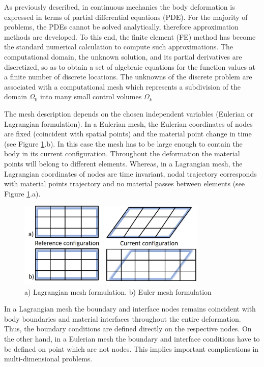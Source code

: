 
\label{section:lagrangianmesh}
As previously described, in continuous mechanics the body deformation is expressed in terms of partial differential equations (PDE). For the majority of problems, the PDEs cannot be solved analytically, therefore approximation methods are developed. To this end, the finite element (FE) method has become the standard numerical calculation to compute such approximations. The computational domain, the unknown solution, and its partial derivatives are discretized, so as to obtain a set of algebraic equations for the function values at a finite number of discrete locations. The unknowns of the discrete problem are
associated with a computational mesh which represents a subdivision of the domain $\Omega_0$ into many small control volumes $\Omega_k$


The mesh description depends on the chosen independent variables (Eulerian or Lagrangian formulation). In a Eulerian mesh, the Eulerian coordinates of nodes are fixed (coincident with spatial points) and the material point change in time (see Figure \ref{lagrangian_mesh}.b). In this case the mesh has to be large enough to contain the body in its current configuration. Throughout the deformation the material points will belong to different elements. Whereas, in a Lagrangian mesh, the Lagrangian coordinates of nodes are time invariant, nodal trajectory corresponds with material points trajectory and no material passes between elements (see Figure \ref{lagrangian_mesh}.a). 

\begin{figure}[!h]
\centering
\includegraphics[width=0.8\textwidth,keepaspectratio]{figures/lagrangian_mesh.jpg} 
\caption{a) Lagrangian mesh formulation. b) Euler mesh formulation}
\label{lagrangian_mesh}
\end{figure}
 

In a Lagrangian mesh the boundary and interface nodes remains coincident with body boundaries and material interfaces throughout the entire deformation. Thus, the boundary conditions are defined directly on the respective nodes. On the other hand, in a Eulerian mesh the boundary and interface conditions have to be defined on point which are not nodes. This implies important complications in multi-dimensional problems.  


